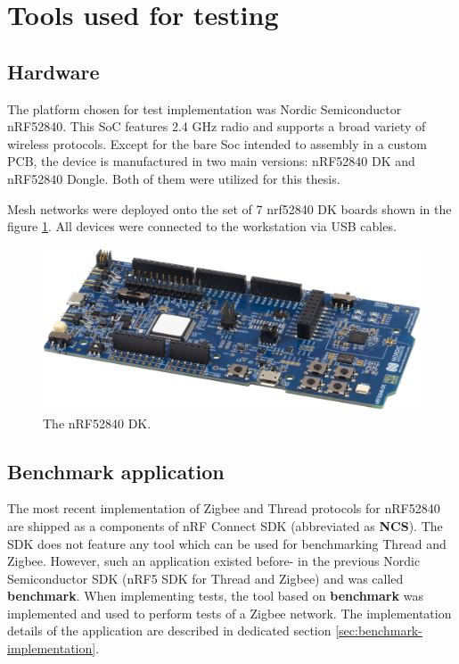 \section{Tools used for testing}

\medskip


\subsection{Hardware}
 The platform chosen for test implementation was Nordic Semiconductor nRF52840. This SoC features 2.4 GHz 
 radio and supports a broad variety of wireless protocols. Except for the bare Soc intended to assembly in a 
 custom PCB, the device is manufactured in two main versions: nRF52840 DK and nRF52840 Dongle. Both of them were 
 utilized for this thesis.
 
 Mesh networks were deployed onto the set of 7 nrf52840 DK boards shown in the figure \ref{fig:test_boards}. All devices were connected to the
 workstation via USB cables.

\begin{figure}[H]
    \centering
    \includegraphics[scale=0.3]{images/test_boards.png}
    \caption{The nRF52840 DK.}
    \label{fig:test_boards}
\end{figure}

\subsection{Benchmark application}
\label{sec:benchmark}

The most recent implementation of Zigbee and Thread protocols for nRF52840 are shipped as a components of nRF
Connect  SDK (abbreviated as \textbf{NCS}). The SDK does not feature any tool which can be used for 
benchmarking Thread and Zigbee. However, such an application existed before- in the previous Nordic Semiconductor SDK (nRF5 SDK for Thread and Zigbee) and was called \textbf{benchmark}. When implementing tests, the tool based on 
\textbf{benchmark} was implemented and used to perform tests of a Zigbee network. The implementation details
of the application are described in dedicated section \ref{sec:benchmark-implementation}.

